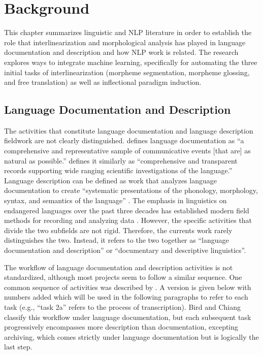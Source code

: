 \chapter{Background}
\label{chap:litreview}

This chapter summarizes linguistic and NLP literature in order to establish the role that interlinearization and morphological analysis has played in language documentation and description and how NLP work is related. The research explores ways to integrate machine learning, specifically for automating the three initial tasks of interlinearization (morpheme segmentation, morpheme glossing, and free translation) as well as inflectional paradigm induction. 

\section{Language Documentation and Description}
\label{sec:LDD}

The activities that constitute language documentation and language description fieldwork are not clearly distinguished. \citet{himmelmann_documentary_1998} defines language documentation as ``a comprehensive and representative sample of communicative events [that are] as natural as possible.” \citet{woodbury_defining_2003} defines it similarly as “comprehensive and transparent records supporting wide ranging scientific investigations of the language.” Language description can be defined as work that analyzes language documentation to create “systematic presentations of the phonology, morphology, syntax, and semantics of the language” \citep{bird_machine_2012}. The emphasis in linguistics on endangered languages over the past three decades has established modern field methods for recording and analyzing data \citep{bowern_linguistic_2008,czaykowska-higgins_research_2009,lupke_data_2010,vallejos_integrating_2014,rice_community-based_2017}. However, the specific activities that divide the two subfields are not rigid. Therefore, the currents work rarely distinguishes the two. Instead, it refers to the two together as “language documentation and description” or “documentary and descriptive linguistics”.

The workflow of language documentation and description activities is not standardized, although most projects seem to follow a similar sequence.  One common sequence of activities was described by \citet{bird_machine_2012}. A version is given below with numbers added which will be used in the following paragraphs to refer to each task (e.g., ``task 2a'' refers to the process of transcription). Bird and Chiang classify this workflow under language documentation, but each subsequent task progressively encompasses more description than documentation, excepting archiving, which comes strictly under language documentation but is logically the last step.

